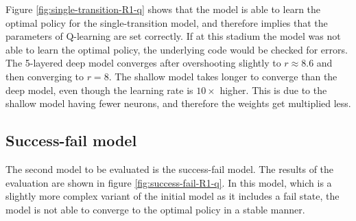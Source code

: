 Figure \ref{fig:single-transition-R1-q} shows that the model is able to learn the optimal policy for the single-transition model, and therefore implies that the parameters of Q-learning are set correctly. If at this stadium the model was not able to learn the optimal policy, the underlying code would be checked for errors. The 5-layered deep model converges after overshooting slightly to $r \approx 8.6$ and then converging to $r = 8$. The shallow model takes longer to converge than the deep model, even though the learning rate is $10 \times$ higher. This is due to the shallow model having fewer neurons, and therefore the weights get multiplied less.

\subsection{Success-fail model}

The second model to be evaluated is the success-fail model. The results of the evaluation are shown in figure \ref{fig:success-fail-R1-q}. In this model, which is a slightly more complex variant of the initial model as it includes a fail state, the model is not able to converge to the optimal policy in a stable manner.

